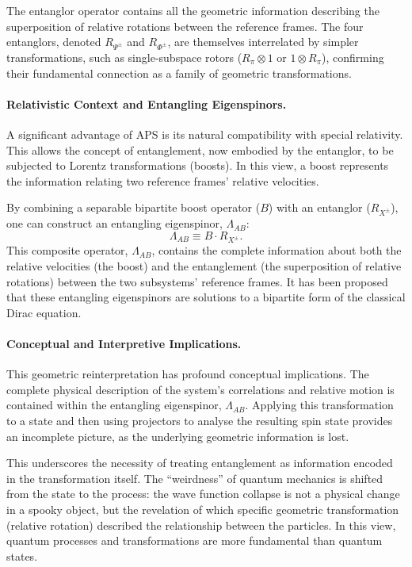 The entanglor operator contains all the geometric information describing the
superposition of relative rotations between the reference frames. The four
entanglors, denoted $R_{\Psi^{\pm}}$ and $R_{\Phi^{\pm}}$, are themselves
interrelated by simpler transformations, such as single-subspace rotors
($R_{\pi} \otimes 1$ or $1 \otimes R_{\pi}$), confirming their fundamental
connection as a family of geometric transformations.

\paragraph{Relativistic Context and Entangling Eigenspinors.}
A significant advantage of APS is its natural compatibility with special
relativity. This allows the concept of entanglement, now embodied by the
entanglor, to be subjected to Lorentz transformations (boosts). In this view,
a boost represents the information relating two reference frames' relative
velocities.

By combining a separable bipartite boost operator ($B$) with an entanglor
($R_{X^{\pm}}$), one can construct an entangling eigenspinor,
$\Lambda_{AB}$:
\begin{equation}
	\Lambda_{AB} \equiv B \cdot R_{X^{\pm}}.
\end{equation}
This composite operator, $\Lambda_{AB}$, contains the complete information
about both the relative velocities (the boost) and the entanglement
(the superposition of relative rotations) between the two subsystems'
reference frames. It has been proposed that these entangling eigenspinors are
solutions to a bipartite form of the classical Dirac equation.

\paragraph{Conceptual and Interpretive Implications.}
This geometric reinterpretation has profound conceptual implications. The
complete physical description of the system's correlations and relative
motion is contained within the entangling eigenspinor, $\Lambda_{AB}$.
Applying this transformation to a state and then using projectors to analyse
the resulting spin state provides an incomplete picture, as the underlying
geometric information is lost.

This underscores the necessity of treating entanglement as information encoded
in the transformation itself. The ``weirdness'' of quantum mechanics is shifted
from the state to the process: the wave function collapse is not a physical
change in a spooky object, but the revelation of which specific geometric
transformation (relative rotation) described the relationship between the
particles. In this view, quantum processes and transformations are more
fundamental than quantum states.
